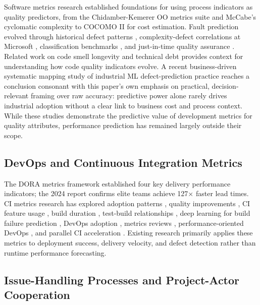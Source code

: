 \documentclass[technologies,article,submit,pdftex,moreauthors]{Definitions/mdpi}
\begin{document}
Software metrics research established foundations for using process indicators as quality predictors, from the Chidamber-Kemerer OO metrics suite \citep{chidamber1994} and McCabe's cyclomatic complexity \citep{mccabe1976} to COCOMO II \citep{boehm2000} for cost estimation. Fault prediction evolved through historical defect patterns \citep{ostrand2002}, complexity-defect correlations at Microsoft \citep{nagappan2006}, classification benchmarks \citep{lessmann2008}, and just-in-time quality assurance \citep{kamei2013}. Related work on code smell longevity \citep{arcoverde2011} and technical debt \citep{li2015} provides context for understanding how code quality indicators evolve. A recent business-driven systematic mapping study of industrial ML defect-prediction practice \citep{stradowski2023business} reaches a conclusion consonant with this paper's own emphasis on practical, decision-relevant framing over raw accuracy: predictive power alone rarely drives industrial adoption without a clear link to business cost and process context. While these studies demonstrate the predictive value of development metrics for quality attributes, performance prediction has remained largely outside their scope.

\subsection{DevOps and Continuous Integration Metrics}\label{sec:rw_devops}

The DORA metrics framework \citep{forsgren2018} established four key delivery performance indicators; the 2024 report \citep{dora2024} confirms elite teams achieve 127\(\times\) faster lead times. CI metrics research has explored adoption patterns \citep{hilton2016}, quality improvements \citep{vasilescu2015}, CI feature usage \citep{gallaba2020}, build duration \citep{ghaleb2019}, test-build relationships \citep{beller2017}, deep learning for build failure prediction \citep{saidani2022}, DevOps adoption \citep{riungu2016}, metrics reviews \citep{devopsmetrics2024}, performance-oriented DevOps \citep{brunnert2015}, and parallel CI acceleration \citep{parallelci2023}. Existing research primarily applies these metrics to deployment success, delivery velocity, and defect detection rather than runtime performance forecasting.

\subsection{Issue-Handling Processes and Project-Actor Cooperation}\label{sec:rw_issue_handling}
\end{document}
